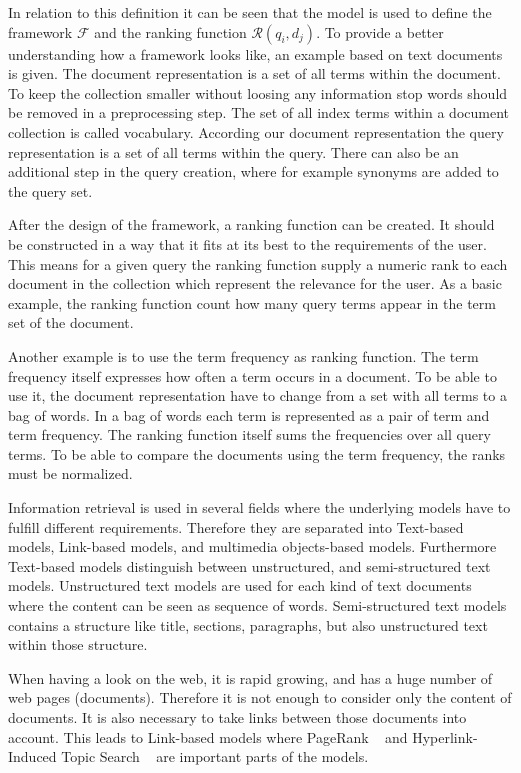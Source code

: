 In relation to this definition it can be seen that the model is used to define the framework $\mathcal{F}$ and the ranking function $\mathcal{R}(q_i, d_j)$. To provide a better understanding how a framework looks like, an example based on text documents is given. The document representation is a set of all terms within the document. To keep the collection smaller without loosing any information stop words should be removed in a preprocessing step. The set of all index terms within a document collection is called vocabulary. According our document representation the query representation is a set of all terms within the query. There can also be an additional step in the query creation, where for example synonyms are added to the query set.

After the design of the framework, a ranking function can be created. It should be constructed in a way that it fits at its best to the requirements of the user. This means for a given query the ranking function supply a numeric rank to each document in the collection which represent the relevance for the user. As a basic example, the ranking function count how many query terms appear in the term set of the document.

Another example is to use the term frequency as ranking function. The term frequency itself expresses how often a term occurs in a document. To be able to use it, the document representation have to change from a set with all terms to a bag of words. In a bag of words each term is represented as a pair of term and term frequency. The ranking function itself sums the frequencies over all query terms. To be able to compare the documents using the term frequency, the ranks must be normalized.

Information retrieval is used in several fields where the underlying models have to fulfill different requirements. Therefore they are separated into Text-based models, Link-based models, and multimedia objects-based models. Furthermore Text-based models distinguish between unstructured, and semi-structured text models. Unstructured text models are used for each kind of text documents where the content can be seen as sequence of words. Semi-structured text models contains a structure like title, sections, paragraphs, but also unstructured text within those structure.

When having a look on the web, it is rapid growing, and has a huge number of web pages (documents). Therefore it is not enough to consider only the content of documents. It is also necessary to take links between those documents into account. This leads to Link-based models where PageRank ~\cite{brin1998anatomy} and Hyperlink-Induced Topic Search ~\cite{kleinberg1999authoritative} are important parts of the models.

